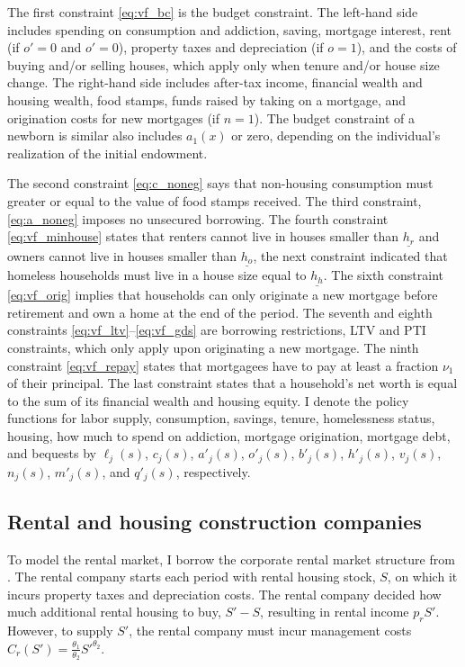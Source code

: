 \documentclass[parskip=full]{article}
\begin{document}
The first constraint \eqref{eq:vf_bc} is the budget constraint. The left-hand side includes spending on consumption and addiction, saving, mortgage interest, rent (if $o'=0$ and $o'=0$), property taxes and depreciation (if $o=1$), and the costs of buying and/or selling houses, which apply only when tenure and/or house size change. The right-hand side includes after-tax income, financial wealth and housing wealth, food stamps, funds raised by taking on a mortgage, and origination costs for new mortgages (if $n=1$). The budget constraint of a newborn is similar also includes $a_1(x)$ or zero, depending on the individual's realization of the initial endowment. 

The second constraint \eqref{eq:c_noneg} says that non-housing consumption must greater or equal to the value of food stamps received. The third constraint, \eqref{eq:a_noneg} imposes no unsecured borrowing. The fourth constraint \eqref{eq:vf_minhouse} states that renters cannot live in houses smaller than $\underline{{h}_r}$ and owners cannot live in houses smaller than $\underline{{h}_o}$, the next constraint indicated that homeless households must live in a house size equal to $\underline{{h}_h}$. The sixth constraint \eqref{eq:vf_orig} implies that households can only originate a new mortgage before retirement and own a home at the end of the period. The seventh and eighth constraints \eqref{eq:vf_ltv}--\eqref{eq:vf_gds} are borrowing restrictions, LTV and PTI constraints, which only apply upon originating a new mortgage. The ninth constraint \eqref{eq:vf_repay} states that mortgagees have to pay at least a fraction $\nu_1$ of their principal. The last constraint states that a household's net worth is equal to the sum of its financial wealth and housing equity. I denote the policy functions for labor supply, consumption, savings, tenure, homelessness status, housing, how much to spend on addiction, mortgage origination, mortgage debt, and bequests by $\ell_{j}(s)$, $c_{j}(s)$, $a'_{j}(s)$, $o'_{j}(s)$, $b'_{j}(s)$, $h'_{j}(s)$, $v_{j}(s)$, $n_j(s)$, $m'_{j}(s)$, and $q'_j(s)$, respectively.

\subsection{Rental and housing construction companies}

To model the rental market, I borrow the corporate rental market structure from \citet{garrigaeetal-2009}. The rental company starts each period with rental housing stock, $S$, on which it incurs property taxes and depreciation costs. The rental company decided how much additional rental housing to buy, $S'-S$, resulting in rental income $p_{r} S'$. However, to supply $S'$, the rental company must incur management costs $C_r(S') = \frac{\theta_1}{\theta_2} S'^{\theta_2}$. 
\end{document}
